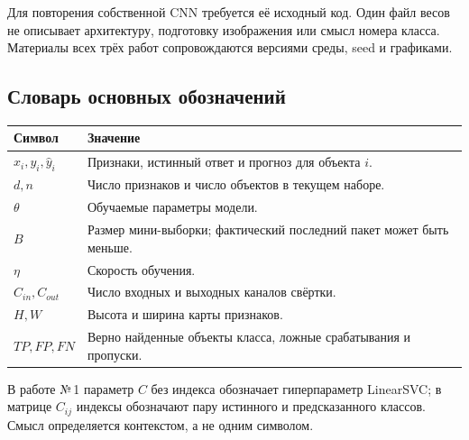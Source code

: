 Для повторения собственной CNN требуется её исходный код. Один файл весов не описывает архитектуру, подготовку изображения или смысл номера класса. Материалы всех трёх работ сопровождаются версиями среды, seed и графиками.

\subsection*{Словарь основных обозначений}
\begin{table}[H]\centering\small
\begin{tabularx}{\textwidth}{@{}l Y@{}}
\toprule
Символ & Значение \\
\midrule
\(x_i, y_i,\widehat y_i\) & Признаки, истинный ответ и прогноз для объекта \(i\). \\
\(d, n\) & Число признаков и число объектов в текущем наборе. \\
\(\theta\) & Обучаемые параметры модели. \\
\(B\) & Размер мини-выборки; фактический последний пакет может быть меньше. \\
\(\eta\) & Скорость обучения. \\
\(C_{in}, C_{out}\) & Число входных и выходных каналов свёртки. \\
\(H,W\) & Высота и ширина карты признаков. \\
\(TP,FP,FN\) & Верно найденные объекты класса, ложные срабатывания и пропуски. \\
\bottomrule
\end{tabularx}\end{table}
В работе №\,1 параметр \(C\) без индекса обозначает гиперпараметр LinearSVC; в матрице \(C_{ij}\) индексы обозначают пару истинного и предсказанного классов. Смысл определяется контекстом, а не одним символом.
